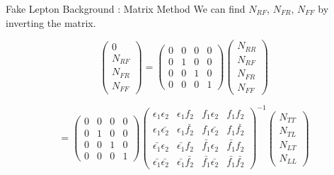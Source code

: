 \documentclass[mathserif,serif]{beamer}
\begin{document}
\begin{frame}{Fake Lepton Background : Matrix Method}
We can find $N_{RF}$, $N_{FR}$, $N_{FF}$ by inverting the matrix.

\begin{equation*}
\left( \begin{array}{c}
0 \\
N_{RF} \\
N_{FR} \\
N_{FF}
\end{array} \right)
=
\left( \begin{array}{cccc}
0 & 0 & 0 & 0 \\
0 & 1 & 0 & 0 \\
0 & 0 & 1 & 0 \\
0 & 0 & 0 & 1
\end{array} \right)
\left( \begin{array}{c}
N_{RR} \\
N_{RF} \\
N_{FR} \\
N_{FF}
\end{array} \right)
\end{equation*}

\begin{equation*}
=
\left( \begin{array}{cccc}
0 & 0 & 0 & 0 \\
0 & 1 & 0 & 0 \\
0 & 0 & 1 & 0 \\
0 & 0 & 0 & 1
\end{array} \right)
\left( \begin{array}{cccc}
\epsilon_1 \epsilon_2 & \epsilon_1 f_2 & f_1 \epsilon_2 & f_1 f_2 \\
\epsilon_1 \bar{\epsilon_2} & \epsilon_1 \bar{f_2} & f_1 \bar{\epsilon_2} & f_1 \bar{f_2} \\
\bar{\epsilon_1} \epsilon_2 & \bar{\epsilon_1} f_2 & \bar{f_1} \epsilon_2 & \bar{f_1} f_2 \\
\bar{\epsilon_1} \bar{\epsilon_2} & \bar{\epsilon_1} \bar{f_2} & \bar{f_1} \bar{\epsilon_2} & \bar{f_1} \bar{f_2}
\end{array} \right)^{-1}
\left( \begin{array}{c}
N_{TT} \\
N_{TL} \\
N_{LT} \\
N_{LL}
\end{array} \right)
\end{equation*}
\end{frame}
\end{document}
